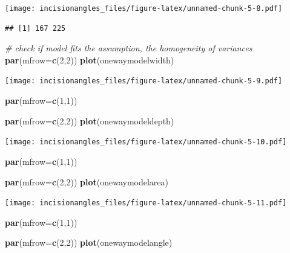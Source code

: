 \documentclass[
]{article}
\newenvironment{Shaded}{\begin{snugshade}}{\end{snugshade}}
\newcommand{\AttributeTok}[1]{\textcolor[rgb]{0.13,0.29,0.53}{#1}}
\newcommand{\CommentTok}[1]{\textcolor[rgb]{0.56,0.35,0.01}{\textit{#1}}}
\newcommand{\DecValTok}[1]{\textcolor[rgb]{0.00,0.00,0.81}{#1}}
\newcommand{\FunctionTok}[1]{\textcolor[rgb]{0.13,0.29,0.53}{\textbf{#1}}}
\newcommand{\NormalTok}[1]{#1}
\begin{document}
\texttt{[image: incisionangles\_files/figure-latex/unnamed-chunk-5-8.pdf]}

\begin{verbatim}
## [1] 167 225
\end{verbatim}

\begin{Shaded}
\begin{Highlighting}[]
\CommentTok{\# check if model fits the assumption, the homogeneity of variances}
\FunctionTok{par}\NormalTok{(}\AttributeTok{mfrow=}\FunctionTok{c}\NormalTok{(}\DecValTok{2}\NormalTok{,}\DecValTok{2}\NormalTok{))}
\FunctionTok{plot}\NormalTok{(onewaymodelwidth)}
\end{Highlighting}
\end{Shaded}

\texttt{[image: incisionangles\_files/figure-latex/unnamed-chunk-5-9.pdf]}

\begin{Shaded}
\begin{Highlighting}[]
\FunctionTok{par}\NormalTok{(}\AttributeTok{mfrow=}\FunctionTok{c}\NormalTok{(}\DecValTok{1}\NormalTok{,}\DecValTok{1}\NormalTok{))}

\FunctionTok{par}\NormalTok{(}\AttributeTok{mfrow=}\FunctionTok{c}\NormalTok{(}\DecValTok{2}\NormalTok{,}\DecValTok{2}\NormalTok{))}
\FunctionTok{plot}\NormalTok{(onewaymodeldepth)}
\end{Highlighting}
\end{Shaded}

\texttt{[image: incisionangles\_files/figure-latex/unnamed-chunk-5-10.pdf]}

\begin{Shaded}
\begin{Highlighting}[]
\FunctionTok{par}\NormalTok{(}\AttributeTok{mfrow=}\FunctionTok{c}\NormalTok{(}\DecValTok{1}\NormalTok{,}\DecValTok{1}\NormalTok{))}

\FunctionTok{par}\NormalTok{(}\AttributeTok{mfrow=}\FunctionTok{c}\NormalTok{(}\DecValTok{2}\NormalTok{,}\DecValTok{2}\NormalTok{))}
\FunctionTok{plot}\NormalTok{(onewaymodelarea)}
\end{Highlighting}
\end{Shaded}

\texttt{[image: incisionangles\_files/figure-latex/unnamed-chunk-5-11.pdf]}

\begin{Shaded}
\begin{Highlighting}[]
\FunctionTok{par}\NormalTok{(}\AttributeTok{mfrow=}\FunctionTok{c}\NormalTok{(}\DecValTok{1}\NormalTok{,}\DecValTok{1}\NormalTok{))}

\FunctionTok{par}\NormalTok{(}\AttributeTok{mfrow=}\FunctionTok{c}\NormalTok{(}\DecValTok{2}\NormalTok{,}\DecValTok{2}\NormalTok{))}
\FunctionTok{plot}\NormalTok{(onewaymodelangle)}
\end{Highlighting}
\end{Shaded}
\end{document}
